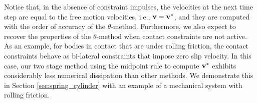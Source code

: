 Notice that, in the absence of constraint impulses, the velocities at the next
time step are equal to the free motion velocities, i.e., ${\mathbf{v}}={\mathbf{v}}^*$, and
they are computed with the order of accuracy of the $\theta\text{-method}$.
Furthermore, we also expect to recover the properties of the
$\theta\text{-method}$ when contact constraints are not active. As an example,
for bodies in contact that are under rolling friction, the contact constraints
behave as bi-lateral constraints that impose zero slip velocity. In this case,
our two stage method using the midpoint rule to compute ${\mathbf{v}}^*$ exhibits
considerably less numerical dissipation than other methods. We demonstrate this
in Section \ref{sec:spring_cylinder} with an example of a mechanical system with
rolling friction.
